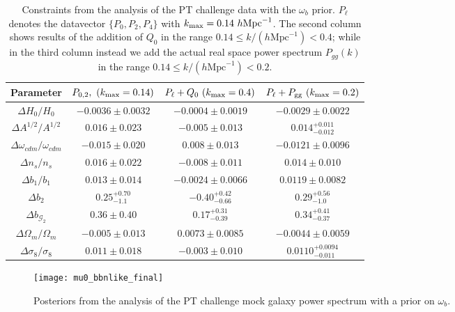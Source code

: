 \documentclass[12pt,a4paper]{article}
\newcommand\hMpc{h\text{Mpc}^{-1}}
\newcommand{\kmax}{k_{\rm max}}
\begin{document}
\begin{table*}[ht!]
\begin{center}
  \begin{tabular}{|c||c|c|c|} \hline
   Parameter   &  $P_{0,2},~(k_{\rm max}=0.14)$ &  $P_\ell+Q_0~(k_{\rm max}=0.4)$  
     &$P_\ell+P_{\rm gg}~(k_{\rm max}=0.2)$ 
     \\ [0.2cm]
      \hline 
$\Delta H_0/H_0$    & $-0.0036\pm 0.0032  $
& $-0.0004\pm 0.0019$  
& $-0.0029\pm 0.0022  $\\ \hline
$\Delta A^{1/2}/A^{1/2}$   & $0.016\pm 0.023 $
& $-0.005\pm 0.013  $
& $0.014^{+0.011}_{-0.012} $
\\ 
\hline
     $\Delta\omega_{cdm}/\omega_{cdm}$  &
$-0.015\pm 0.020$
  & $0.008\pm 0.013  $
  & $-0.0121\pm 0.0096$
   \\  \hline
     $\Delta n_s/n_s$  &
$0.016\pm 0.022 $
  & $-0.008\pm 0.011$
  & $0.014\pm 0.010$
   \\  \hline
   $\Delta b_1/b_1$   & $0.013\pm 0.014   $
& $-0.0024\pm 0.0066 $
& $0.0119\pm 0.0082   $
\\ 
\hline
$\Delta b_2$   & $0.25^{+0.70}_{-1.1}$
& $-0.40^{+0.42}_{-0.66} $
& $0.29^{+0.56}_{-1.0} $
\\ 
\hline
$\Delta b_{\mathcal{G}_2}$   & $0.36\pm 0.40  $
& $0.17^{+0.31}_{-0.39}  $
& $0.34^{+0.41}_{-0.37}  $
\\ 
   \hline \hline 
$\Delta\Omega_m/\Omega_m$   & $-0.005\pm 0.013 $
& $0.0073\pm 0.0085 $
& $-0.0044\pm 0.0059 $\\ \hline
$\Delta\sigma_8/\sigma_8$   
& $0.011\pm 0.018$
&$-0.003\pm 0.010 $ 
&$0.0110^{+0.0094}_{-0.011} $ \\ 
\hline
\end{tabular}
\caption{Constraints from the analysis of the PT challenge data with the $\omega_b$ prior. $P_\ell$ denotes the datavector $\{P_0,P_2,P_4\}$ with $\kmax=0.14~\hMpc$. The second column 
shows results of the addition of $Q_0$ in the range $0.14\leq k/(\hMpc)<0.4$; while in the third column instead we add
the actual real space power spectrum $P_{gg}(k)$ in the range 
$0.14\leq k/(\hMpc)<0.2$.
}
\label{tab:ob}
\end{center}
\end{table*}
\begin{figure}[ht!]
\centering
 \texttt{[image: mu0\_bbnlike\_final]}
    \caption{
Posteriors from the analysis of the 
    PT challenge mock galaxy power spectrum
    with a prior on $\omega_b$. 
    }
    \label{fig:mu0ns}
\end{figure}
\end{document}
